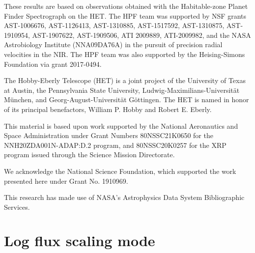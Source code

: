 \documentclass[twocolumn]{aastex631}
\begin{document}
\begin{acknowledgments}

    These results are based on observations obtained with the Habitable-zone Planet Finder Spectrograph on the HET. The HPF team was supported by NSF grants AST-1006676, AST-1126413, AST-1310885, AST-1517592, AST-1310875, AST-1910954, AST-1907622, AST-1909506, ATI 2009889, ATI-2009982, and the NASA Astrobiology Institute (NNA09DA76A) in the pursuit of precision radial velocities in the NIR. The HPF team was also supported by the Heising-Simons Foundation via grant 2017-0494.

    The Hobby-Eberly Telescope (HET) is a joint project of the University of Texas at Austin, the Pennsylvania State University, Ludwig-Maximilians-Universit\"at M\"unchen, and Georg-August-Universit\"at G\"ottingen. The HET is named in honor of its principal benefactors, William P. Hobby and Robert E. Eberly.

    This material is based upon work supported by the National Aeronautics and Space Administration under Grant Numbers 80NSSC21K0650 for the NNH20ZDA001N-ADAP:D.2 program,
    and 80NSSC20K0257 for the XRP program issued through the Science Mission Directorate.

    We acknowledge the National Science Foundation, which supported the work presented here under Grant No. 1910969.

    This research has made use of NASA's Astrophysics Data System Bibliographic Services.

\end{acknowledgments}








\clearpage

\appendix
\restartappendixnumbering

\section{Log flux scaling mode} \label{appendixLogScale}
\end{document}
